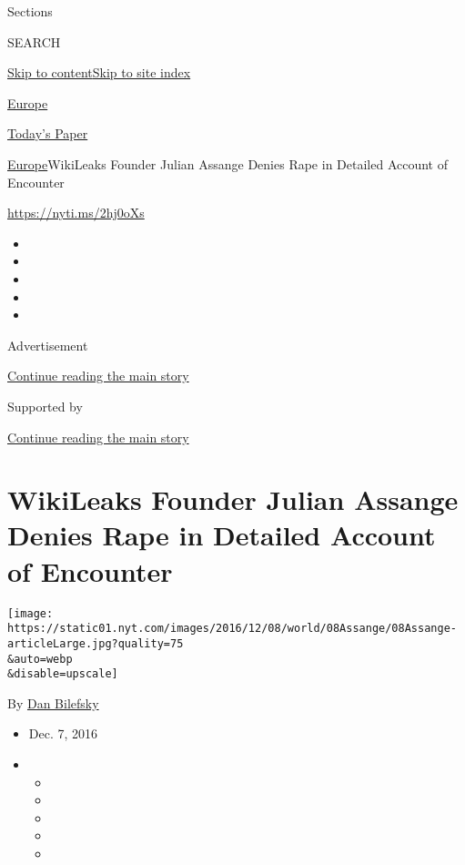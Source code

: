 Sections

SEARCH

\protect\hyperlink{site-content}{Skip to
content}\protect\hyperlink{site-index}{Skip to site index}

\href{https://www.nytimes.com/section/world/europe}{Europe}

\href{https://myaccount.nytimes.com/auth/login?response_type=cookie\&client_id=vi}{}

\href{https://www.nytimes.com/section/todayspaper}{Today's Paper}

\href{/section/world/europe}{Europe}\textbar{}WikiLeaks Founder Julian
Assange Denies Rape in Detailed Account of Encounter

\url{https://nyti.ms/2hj0oXs}

\begin{itemize}
\item
\item
\item
\item
\item
\end{itemize}

Advertisement

\protect\hyperlink{after-top}{Continue reading the main story}

Supported by

\protect\hyperlink{after-sponsor}{Continue reading the main story}

\hypertarget{wikileaks-founder-julian-assange-denies-rape-in-detailed-account-of-encounter}{%
\section{WikiLeaks Founder Julian Assange Denies Rape in Detailed
Account of
Encounter}\label{wikileaks-founder-julian-assange-denies-rape-in-detailed-account-of-encounter}}

\texttt{[image: https://static01.nyt.com/images/2016/12/08/world/08Assange/08Assange-articleLarge.jpg?quality=75\\\&auto=webp\\\&disable=upscale]}

By \href{http://www.nytimes.com/by/dan-bilefsky}{Dan Bilefsky}

\begin{itemize}
\item
  Dec. 7, 2016
\item
  \begin{itemize}
  \item
  \item
  \item
  \item
  \item
  \end{itemize}
\end{itemize}

